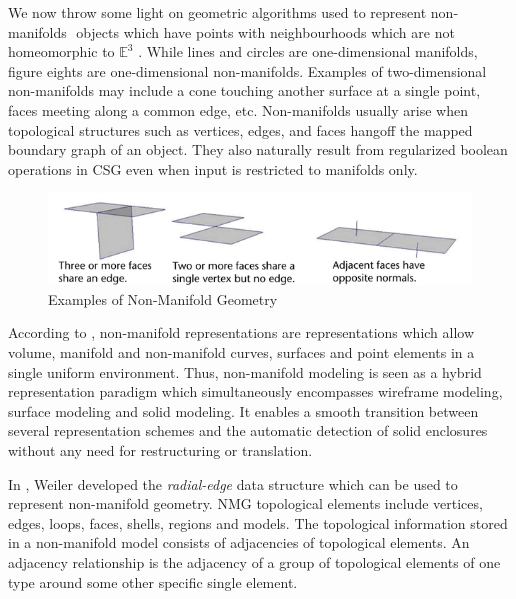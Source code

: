 \hspace{30} We   now   throw   some   light   on   geometric   algorithms   used   to   represent  
non­manifolds   ­   objects   which   have   points   with   neighbourhoods   which   are   not  
homeomorphic   to   $\mathbb{E}^3$ .   While   lines   and   circles   are   one-­dimensional   manifolds,  
figure   eights   are   one­-dimensional   non­-manifolds.   Examples   of   two-­dimensional  
non­-manifolds   may   include   a   cone   touching   another   surface   at   a   single   point,  
faces   meeting   along   a   common   edge,   etc.   Non-­manifolds   usually   arise   when  
topological   structures   such   as   vertices,   edges,   and   faces   hang­off   the   mapped  
boundary   graph   of   an   object.   They   also   naturally   result   from   regularized  
boolean operations in CSG even when input is restricted to manifolds only.  

\begin{figure}[htbp]
\centering
\includegraphics[trim=0.0cm 0.1cm 0.1cm 0.1cm, clip=true, totalheight=0.1\textheight]{Pictures/NMG.png}
\caption[Examples of Non­-Manifold Geometry]{Examples of Non-Manifold Geometry}
\label{NMG}
\end{figure}

\hspace{30} According   to   \cite{2},   non­-manifold   representations   are   representations   which  
allow   volume,   manifold   and   non­-manifold   curves,   surfaces   and   point   elements  
in   a   single   uniform   environment.   Thus,   non-­manifold   modeling   is   seen   as   a  
hybrid   representation   paradigm   which   simultaneously   encompasses   wireframe  
modeling,   surface   modeling   and   solid   modeling.   It   enables   a   smooth   transition  
between   several   representation   schemes   and   the   automatic   detection   of   solid  
enclosures without any need for restructuring or translation.  

\hspace{30} In   \cite{2},   Weiler   developed   the   \textit{radial-­edge}   data   structure   which   can   be  
used   to   represent   non-­manifold   geometry.   NMG   topological   elements   include  
vertices,   edges,   loops,   faces,   shells,   regions   and   models.   The   topological  
information   stored   in   a   non­-manifold   model   consists   of   adjacencies   of  
topological   elements.   An   adjacency   relationship   is   the   adjacency   of   a   group   of  
topological   elements   of   one   type   around   some   other   specific   single   element.

